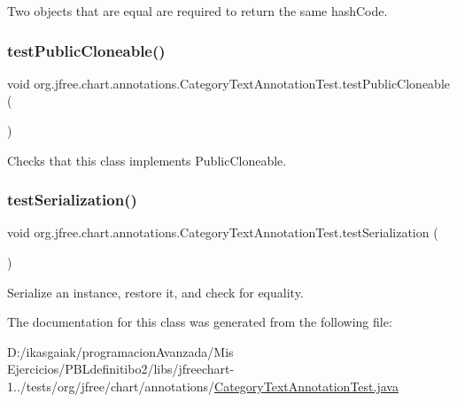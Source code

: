 Two objects that are equal are required to return the same hash\+Code. \mbox{\label{classorg_1_1jfree_1_1chart_1_1annotations_1_1_category_text_annotation_test_add3bb60630ac1830eeedb7873c517e14}} 
\subsubsection{\texorpdfstring{test\+Public\+Cloneable()}{testPublicCloneable()}}
{\footnotesize\ttfamily void org.\+jfree.\+chart.\+annotations.\+Category\+Text\+Annotation\+Test.\+test\+Public\+Cloneable (\begin{DoxyParamCaption}{ }\end{DoxyParamCaption})}

Checks that this class implements Public\+Cloneable. \mbox{\label{classorg_1_1jfree_1_1chart_1_1annotations_1_1_category_text_annotation_test_aea50b3687596edbf050e51de75fd1c3a}} 
\subsubsection{\texorpdfstring{test\+Serialization()}{testSerialization()}}
{\footnotesize\ttfamily void org.\+jfree.\+chart.\+annotations.\+Category\+Text\+Annotation\+Test.\+test\+Serialization (\begin{DoxyParamCaption}{ }\end{DoxyParamCaption})}

Serialize an instance, restore it, and check for equality. 

The documentation for this class was generated from the following file\+:\begin{DoxyCompactItemize}
\item 
D\+:/ikasgaiak/programacion\+Avanzada/\+Mis Ejercicios/\+P\+B\+Ldefinitibo2/libs/jfreechart-\/1../tests/org/jfree/chart/annotations/\mbox{\hyperlink{_category_text_annotation_test_8java}{Category\+Text\+Annotation\+Test.\+java}}\end{DoxyCompactItemize}
